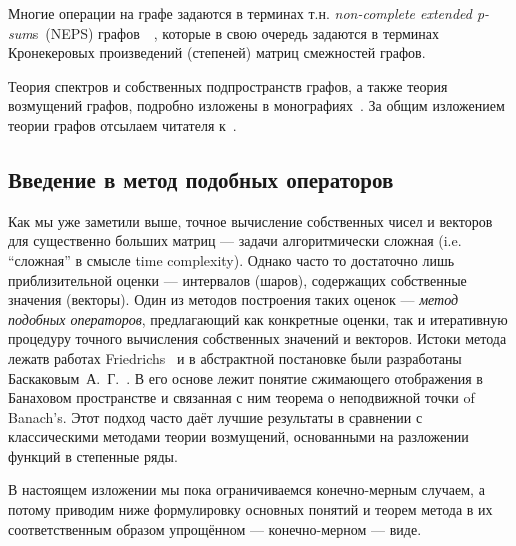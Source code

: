 \documentclass[14pt,a4paper]{extarticle}
\numberwithin{equation}{section}
\theoremstyle{definition}
\begin{document}
Многие операции на графе задаются в терминах т.н.
    \emph{non-complete extended p-sum}s~(NEPS)
    графов~\cite[p.~44]{cvetkovic2010introduction}~\cite{cvetkovic1997eigenspaces},
    которые в свою очередь задаются в терминах Кронекеровых произве\-де\-ний (степеней) матриц
    смежностей графов.

Теория спектров и собственных подпространств графов,
    а также теория возмущений графов, подробно изложены в
    монографиях~\cite{cvetkovic1997eigenspaces,cvetkovic1980spectra,cvetkovic2010introduction}.
    За общим изложением теории графов отсылаем читателя к~\cite{godsil2013algebraic}.


\subsection{Введение в метод подобных операторов}

Как мы уже заметили выше, точное вычисление собствен\-ных чисел и векторов
для сущ\-ествен\-но больших матриц --- задачи алгоритмически сложная (i.e. ``сложная'' в
смысле time complexity). Однако часто то достаточно лишь при\-близ\-ительной оценки
--- интер\-валов (шаров), со\-держ\-ащих собствен\-ные зна\-чения (векторы).
Один из методов построения таких оценок ---
\emph{метод подобных операторов}, предлагающий как кон\-крет\-ные оценки, так и
итеративную процедуру точного вычисления собственных значений и векторов.
Истоки метода лежатв работах Fried\-richs~\cite{friedrichs1965advanced} и в
абстрактной постановке были разработаны
Баскак\-овым~А.~Г.~\cite{baskakov1986theorem,baskakov1987theorem,baskakov1994spectral,baskakov2002splitting}.
В его основе лежит понятие сжимающего отображения в Банаховом пространстве
и связанная с ним теорема о неподвижной точки of Banach's.
Этот подход часто даёт лучшие результаты в сравнении с клас\-сич\-еск\-ими методами
теории возмущений, основанными на разложе\-нии функций в степенные ряды.

В настоящем изложении мы пока ограни\-чиваемся конечно-мерным случаем, а потому
приводим ниже формулировку основных понятий и теорем метода в их соответственным
образом упрощённом --- конечно-мерном --- виде.
\end{document}
